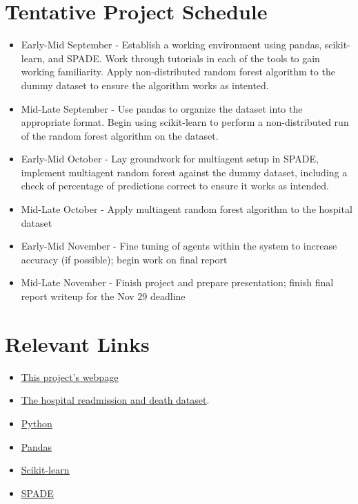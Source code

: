 \documentclass[a4paper,12pt]{article}
\begin{document}
\section{Tentative Project Schedule}
\begin{itemize}
	\item Early-Mid September - Establish a working environment using pandas, scikit-learn, and SPADE. Work through tutorials in each of the tools to gain working familiarity. Apply non-distributed random forest algorithm to the dummy dataset to ensure the algorithm works as intented.
	\item Mid-Late September - Use pandas to organize the dataset into the appropriate format. Begin using scikit-learn to perform a non-distributed run of the random forest algorithm on the dataset.
	\item Early-Mid October - Lay groundwork for multiagent setup in SPADE, implement multiagent random forest against the dummy dataset, including a check of percentage of predictions correct to ensure it works as intended.
	\item Mid-Late October - Apply multiagent random forest algorithm to the hospital dataset
	\item Early-Mid November - Fine tuning of agents within the system to increase accuracy (if possible); begin work on final report
	\item Mid-Late November - Finish project and prepare presentation; finish final report writeup for the Nov 29 deadline
\end{itemize}

\section{Relevant Links}
\begin{itemize}
	\item \textcolor{blue}{\underline{\href{https://my.vanderbilt.edu/berryap}{This project's webpage}}}
	\item \textcolor{blue}{\underline{\href{https://catalog.data.gov/dataset/readmissions-and-deaths-hospital}{The hospital readmission and death dataset}}}.
	\item \textcolor{blue}{\underline{\href{https://www.python.org/}{Python}}}
	\item \textcolor{blue}{\underline{\href{http://pandas.pydata.org/}{Pandas}}}
	\item \textcolor{blue}{\underline{\href{http://scikit-learn.org/stable/}{Scikit-learn}}}
	\item \textcolor{blue}{\underline{\href{https://pypi.python.org/pypi/SPADE}{SPADE}}}
\end{itemize}
		
\end{document}
